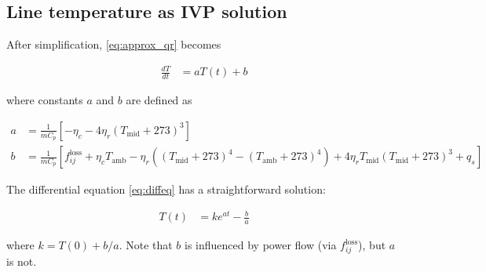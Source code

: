 \documentclass{article}
\begin{document}
\subsection{Line temperature as IVP solution}
After simplification, \eqref{eq:approx_qr} becomes

\begin{align}\label{eq:diffeq}
\frac{dT}{dt} &= aT(t) + b
\end{align}

where constants $a$ and $b$ are defined as

\begin{subequations}
\begin{align}
a &= \frac{1}{mC_p} \left[ -\eta_c - 4\eta_r(T_\text{mid} + 273)^3 \right] \\
b &= \frac{1}{mC_p} \left[ f_{ij}^\text{loss} + \eta_cT_\text{amb} - \eta_r \left( (T_\text{mid} + 273)^4 - (T_\text{amb} + 273)^4 \right) + 4\eta_rT_\text{mid}(T_\text{mid} + 273)^3 + q_s \right]
\end{align}
\end{subequations}

The differential equation \eqref{eq:diffeq} has a straightforward solution:

\begin{align}\label{eq:tivp}
T(t) &= ke^{at} - \frac{b}{a}
\end{align}

where $k=T(0) + b/a$. Note that $b$ is influenced by power flow (via
$f_{ij}^\text{loss}$), but $a$ is not.

%
%
%
%    
    
\end{document}
